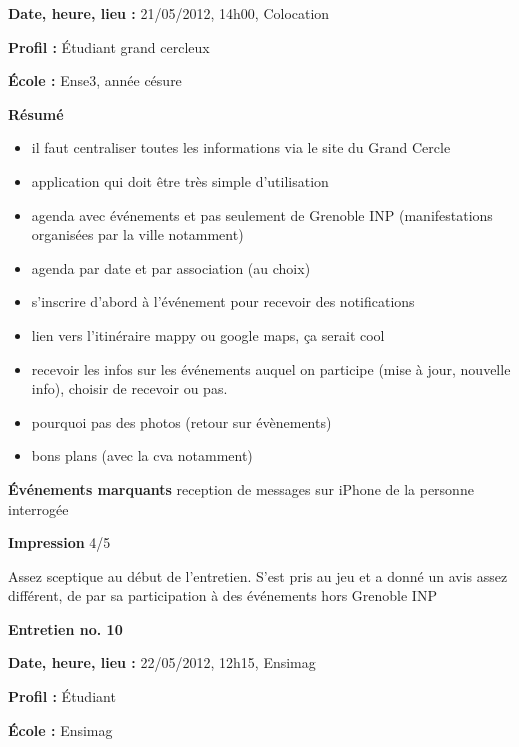 \documentclass[a4paper, 11px]{article}
\begin{document}
\textbf{Date, heure, lieu : }
21/05/2012, 14h00, Colocation

\textbf{Profil : }
Étudiant grand cercleux

\textbf{École : }
Ense3, année césure

\textbf{Résumé}
	\begin{itemize}
		\item il faut centraliser toutes les informations via le site du Grand Cercle
		\item application qui doit être très simple d'utilisation
		\item agenda avec événements et pas seulement de Grenoble INP (manifestations organisées par la ville notamment)
		\item agenda par date et par association (au choix)
		\item s’inscrire d'abord à l’événement pour recevoir des notifications
		\item lien vers l’itinéraire mappy ou google maps, ça serait cool
		\item recevoir les infos sur les événements auquel on participe (mise à jour, nouvelle
     info), choisir de recevoir ou pas.
		\item pourquoi pas des photos (retour sur évènements)
		\item bons plans (avec la cva notamment)

	\end{itemize}

\textbf{Événements marquants}
reception de messages sur iPhone de la personne interrogée

\textbf{Impression}
4/5

Assez sceptique au début de l'entretien. S'est pris au jeu et a donné un avis assez différent, de par sa participation à des événements hors Grenoble INP



\vspace{.3cm}

 \textbf {\large Entretien no. 10}

\textbf{Date, heure, lieu : }
22/05/2012, 12h15, Ensimag

\textbf{Profil : }
Étudiant

\textbf{École : }
Ensimag
\end{document}
